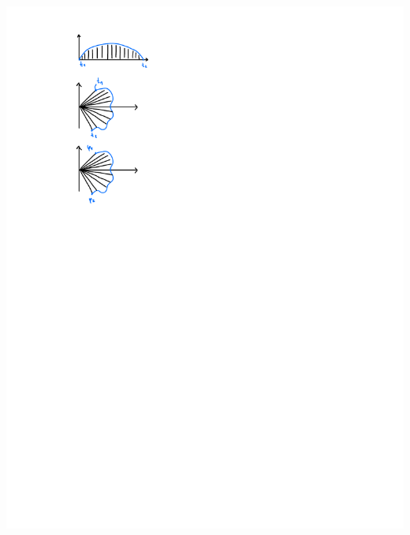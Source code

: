     \begin{minipage}{0.34\linewidth}
        \includegraphics[width=0.6\linewidth]{src/Integralrechnung/polar.pdf}
    \end{minipage}

    

